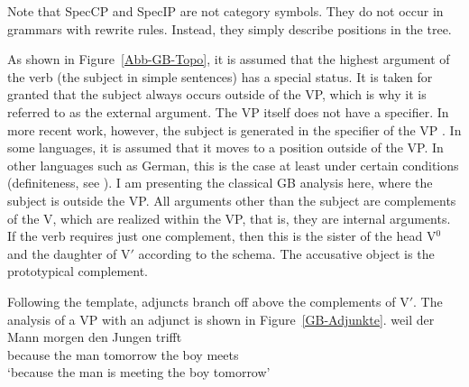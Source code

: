 Note that SpecCP and SpecIP are not category symbols. They do not occur in grammars with rewrite rules. Instead, they simply describe
positions in the tree.%

As shown in Figure~\ref{Abb-GB-Topo}, it is assumed that the highest argument of the verb (the subject in simple sentences) 
has a special status. It is taken for granted that the subject always occurs outside of the VP, which is why it is referred
to as the external argument. The VP itself does not have a specifier. In more recent work, however, the subject
is generated in the specifier of the VP \citep{FS86a-u,KS91a-u}. In some languages, it is assumed that it moves to a position
outside of the VP. In other languages such as German, this is the case at least under certain conditions (\eg definiteness, see
\citealp{Diesing92a}). I am presenting the classical GB analysis here, where the subject is outside the VP. All arguments other than
the subject are complements of the V, which are realized within the VP, that is, they are internal arguments. If the verb requires just one complement, then this is the
sister of the head V$^0$ and the daughter of V$'$ according to the \xbar schema. The accusative object is the prototypical complement.

Following the \xbar template, adjuncts branch off above the complements of V$'$. The analysis of a VP
with an adjunct is shown in Figure~\vref{GB-Adjunkte}.
\ea
\gll weil der Mann morgen den Jungen trifft\\
	 because the man tomorrow the boy meets\\
\glt `because the man is meeting the boy tomorrow'
\z

